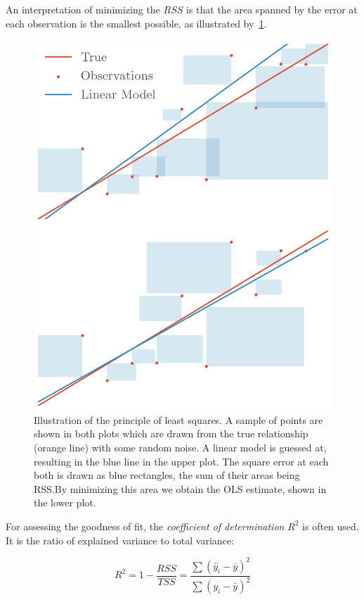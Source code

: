 An interpretation of minimizing the \(RSS\) is that the area spanned by the
error at each observation is the smallest possible, as illustrated by~\cref{fig:lq}.
\begin{figure}[]
  \centering
  \showthe\columnwidth
  \includegraphics[]{figures/leastsquares.png}
  \caption{\label{fig:lq} Illustration of the principle of least squares. A
    sample of points are shown in both plots which are drawn from the true
    relationship (orange line) with some random noise. A linear model is
    guessed at, resulting in the blue line in the upper plot. The square error at
    each both is drawn as blue rectangles, the sum of their areas being RSS.\@ By
    minimizing this area we obtain the OLS estimate, shown in the lower plot.}
\end{figure}

For assessing the goodness of fit, the \textit{coefficient of determination}
\(R^{2}\) is often used. It is the ratio of explained variance to total variance:

\begin{equation*}
  R^{2} = 1 - \frac{RSS}{TSS} = \frac{\sum \left(\hat y_{i} - \bar{y} \right)^{2}}{\sum\left(y_{i} - \bar y \right)^{2}}
\end{equation*}

